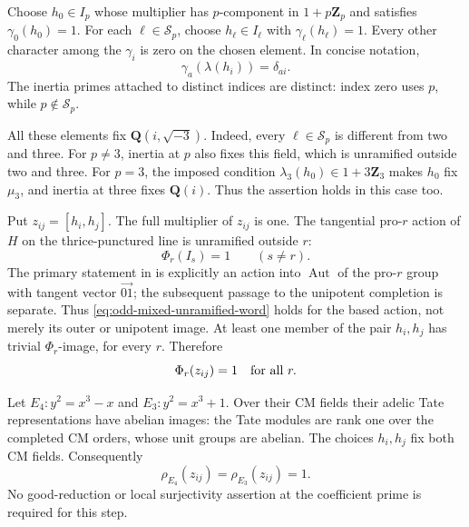 Choose \(h_0\in I_p\) whose multiplier has \(p\)-component
in \(1+p\mathbf Z_p\) and satisfies \(\gamma_0(h_0)=1\).
For each \(\ell\in\mathcal S_p\), choose
\(h_\ell\in I_\ell\) with \(\gamma_\ell(h_\ell)=1\).
Every other character among the \(\gamma_i\) is zero on
the chosen element.  In concise notation,
\begin{equation}\label{eq:odd-mixed-inertia-coordinates}
                         \gamma_a(\lambda(h_i))=\delta_{ai}.
\end{equation}
The inertia primes attached to distinct indices are distinct:
index zero uses \(p\), while \(p\notin\mathcal S_p\).

All these elements fix \(\mathbf Q(i,\sqrt{-3})\).
Indeed, every \(\ell\in\mathcal S_p\) is different from
two and three.  For \(p\ne3\), inertia at \(p\) also fixes
this field, which is unramified outside two and three.
For \(p=3\), the imposed condition
\(\lambda_3(h_0)\in1+3\mathbf Z_3\) makes \(h_0\) fix
\(\mu_3\), and inertia at three fixes \(\mathbf Q(i)\).
Thus the assertion holds in this case too.

Put \(z_{ij}=[h_i,h_j]\).  The full multiplier of \(z_{ij}\)
is one.  The tangential pro-\(r\) action of \(H\) on the
thrice-punctured line is unramified outside \(r\):
\begin{equation}\label{eq:odd-mixed-unramified-word}
                              \Phi_r(I_s)=1\qquad(s\ne r).
\end{equation}
The primary statement in \cite[\S8.5, pp.~151--152]{HainMatsumoto2003}
is explicitly an action into \(\operatorname{Aut}\) of the
pro-\(r\) group with tangent vector \(\overrightarrow{01}\);
the subsequent passage to the unipotent completion is separate.
Thus \eqref{eq:odd-mixed-unramified-word} holds for the based
action, not merely its outer or unipotent image.
At least one member of the pair \(h_i,h_j\) has trivial
\(\Phi_r\)-image, for every \(r\).  Therefore
\begin{equation}\label{eq:odd-mixed-z-word}
                              \Phi_r(z_{ij})=1\quad\hbox{for all }r.
\end{equation}

Let \(E_4:y^2=x^3-x\) and \(E_3:y^2=x^3+1\).
Over their CM fields their adelic Tate representations have
abelian images: the Tate modules are rank one over the
completed CM orders, whose unit groups are abelian.
The choices \(h_i,h_j\) fix both CM fields.  Consequently
\begin{equation}\label{eq:odd-mixed-z-CM}
                 \rho_{E_4}(z_{ij})=\rho_{E_3}(z_{ij})=1.
\end{equation}
No good-reduction or local surjectivity assertion at the
coefficient prime is required for this step.


